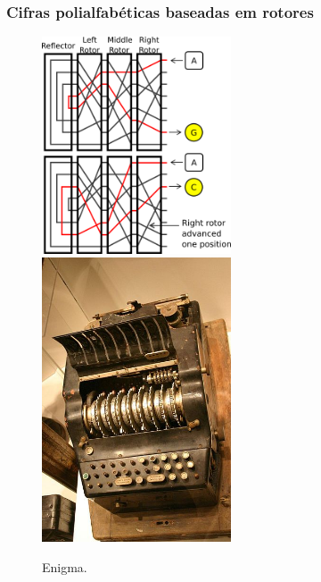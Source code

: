 \begin{frame}
\frametitle{Cifras polialfabéticas baseadas em rotores}
\scriptsize
\begin{figure}[h]
\centering
\includegraphics[width=0.5\textwidth,height=0.5\textheight,keepaspectratio]{figures/enigmaaction.png}
\includegraphics[width=0.5\textwidth,height=0.5\textheight,keepaspectratio]{figures/enigma.jpg}
\caption{Enigma.}
\label{fig-enigma}
\end{figure}
\vspace{-3ex}
\end{frame}


